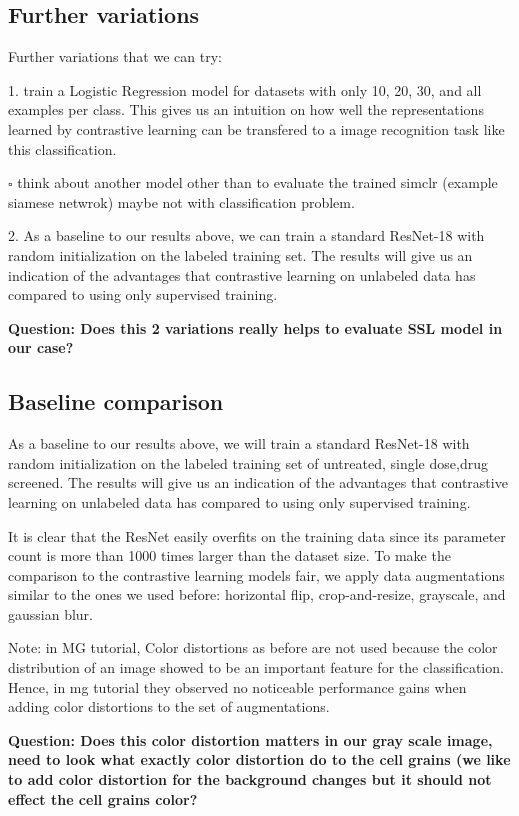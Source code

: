 \documentclass[12pt,twoside,a4paper,parskip]{scrbook} %
\begin{document}
\subsection{Further variations}
Further variations that we can try: 

1. train a Logistic Regression model for datasets with only 10, 20, 30, and all  examples per class. This gives us an intuition on how well the representations learned by contrastive learning can be transfered to a image recognition task like this classification.

$\square$ think about another model other than to evaluate the trained simclr (example siamese netwrok) maybe not with classification problem.

2. As a baseline to our results above, we can train a standard ResNet-18 with random initialization on the labeled training set. The results will give us an indication of the advantages that contrastive learning on unlabeled data has compared to using only supervised training.

\textbf{Question: Does this 2 variations really helps to evaluate SSL model in our case?} 
\subsection{Baseline comparison}
As a baseline to our results above, we will train a standard ResNet-18 with random initialization on the labeled training set of untreated, single dose,drug screened. The results will give us an indication of the advantages that contrastive learning on unlabeled data has compared to using only supervised training.

It is clear that the ResNet easily overfits on the training data since its parameter count is more than 1000 times larger than the dataset size. To make the comparison to the contrastive learning models fair, we apply data augmentations similar to the ones we used before: horizontal flip, crop-and-resize, grayscale, and gaussian blur. 

Note: in MG tutorial, Color distortions as before are not used because the color distribution of an image showed to be an important feature for the classification. Hence, in mg tutorial they observed no noticeable performance gains when adding color distortions to the set of augmentations.

\textbf{Question: Does this color distortion matters in our gray scale image, need to look what exactly color distortion do to the cell grains (we like to add color distortion for the background changes but it should not effect the cell grains color?} 
\end{document}
